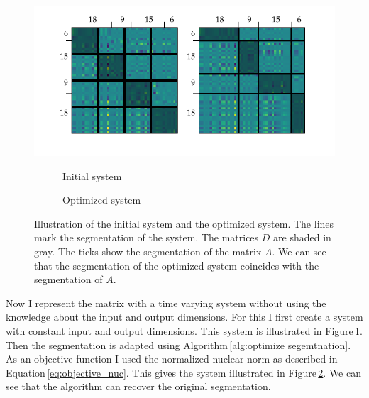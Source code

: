 \documentclass[doctype=mastersthesis,BCOR=15mm,biblatex]{ldvbook}%
\begin{document}
\begin{figure}[!htb]
	\centering
	\includegraphics[trim=0.4cm 0.9cm 0 0, clip,width=\textwidth]{Plots/example_move.pdf}
	\begin{subfigure}[b]{0.35\textwidth}
		\caption{Initial system}
		\label{fig:example_move_a}
	\end{subfigure}
	\hspace{0.8cm}
	\begin{subfigure}[b]{0.35\textwidth}
		\caption{Optimized system}
		\label{fig:example_move_b}
	\end{subfigure}
	\caption{Illustration of the initial system and the optimized system.
		The lines mark the segmentation of the system.
		The matrices $D$ are shaded in gray.
		The ticks show the segmentation of the matrix $A$. 
		We can see that the segmentation of the optimized system coincides with the segmentation of $A$.}
	\label{fig:example_move}
\end{figure}
Now I represent the matrix with a time varying system without using the knowledge about the input and output dimensions.
For this I first create a system with constant input and output dimensions.
This system is illustrated in Figure\,\ref{fig:example_move_a}.
Then the segmentation is adapted using Algorithm\,\ref{alg:optimize segemtnation}.
As an objective function I used the normalized nuclear norm as described in Equation\,\ref{eq:objective_nuc}.
This gives the system illustrated in Figure\,\ref{fig:example_move_b}.
We can see that the algorithm can recover the original segmentation.
 
\end{document}
